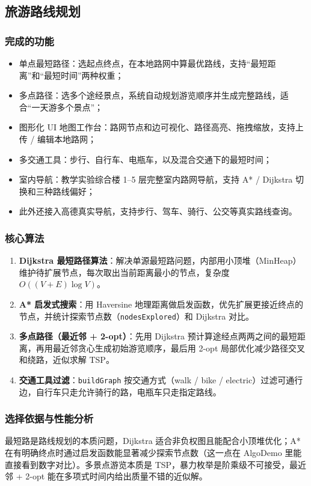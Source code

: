 \documentclass[UTF8,a4paper,12pt]{ctexart}
\begin{document}
\subsection{旅游路线规划}

\subsubsection{完成的功能}
\begin{itemize}
\item 单点最短路径：选起点终点，在本地路网中算最优路线，支持“最短距离”和“最短时间”两种权重；
\item 多点路径：选多个途经景点，系统自动规划游览顺序并生成完整路线，适合“一天游多个景点”；
\item 图形化 UI 地图工作台：路网节点和边可视化、路径高亮、拖拽缩放，支持上传 / 编辑本地路网；
\item 多交通工具：步行、自行车、电瓶车，以及混合交通下的最短时间；
\item 室内导航：教学实验综合楼 1--5 层完整室内路网导航，支持 A* / Dijkstra 切换和三种路线偏好；
\item 此外还接入高德真实导航，支持步行、驾车、骑行、公交等真实路线查询。
\end{itemize}

\subsubsection{核心算法}
\begin{enumerate}
\item \textbf{Dijkstra 最短路径算法}：解决单源最短路问题，内部用小顶堆（MinHeap）维护待扩展节点，每次取出当前距离最小的节点，复杂度 $O((V+E)\log V)$。
\item \textbf{A* 启发式搜索}：用 Haversine 地理距离做启发函数，优先扩展更接近终点的节点，并统计探索节点数（\texttt{nodesExplored}）和 Dijkstra 对比。
\item \textbf{多点路径（最近邻 + 2-opt）}：先用 Dijkstra 预计算途经点两两之间的最短距离，再用最近邻贪心生成初始游览顺序，最后用 2-opt 局部优化减少路径交叉和绕路，近似求解 TSP。
\item \textbf{交通工具过滤}：\texttt{buildGraph} 按交通方式（walk / bike / electric）过滤可通行边，自行车只走允许骑行的路，电瓶车只走指定路线。
\end{enumerate}

\subsubsection{选择依据与性能分析}
最短路是路线规划的本质问题，Dijkstra 适合非负权图且能配合小顶堆优化；A* 在有明确终点时通过启发函数能显著减少探索节点数（这一点在 AlgoDemo 里能直接看到数字对比）。多景点游览本质是 TSP，暴力枚举是阶乘级不可接受，最近邻 + 2-opt 能在多项式时间内给出质量不错的近似解。
\end{document}
